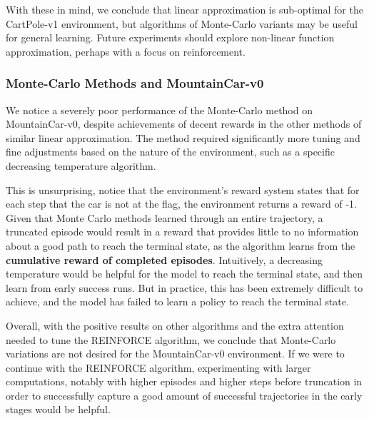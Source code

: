 \documentclass{article}
\begin{document}
With these in mind, we conclude that linear approximation is sub-optimal
for the CartPole-v1 environment, but algorithms of Monte-Carlo variants may be useful for general learning.
Future experiments should explore non-linear function approximation, perhaps with a focus on reinforcement.

\subsubsection{Monte-Carlo Methods and MountainCar-v0}
We notice a severely poor performance of the Monte-Carlo method on MountainCar-v0,
despite achievements of decent rewards in the other methods of similar linear approximation. The method required
significantly more tuning and fine adjustments based on the nature of the environment,
such as a specific decreasing temperature algorithm.

This is unsurprising, notice that the environment's reward system states that
for each step that the car is not at the flag, the environment returns a reward of -1.
Given that Monte Carlo methods learned through an entire trajectory, a truncated
episode would result in a reward that provides little to no information about a good path to
reach the terminal state, as the algorithm learns from the \textbf{cumulative reward of completed episodes}.
Intuitively, a decreasing temperature would be helpful for the model to reach the terminal state, and then learn from early success runs.
But in practice, this has been extremely difficult to achieve, and the model has failed to learn
a policy to reach the terminal state.

Overall, with the positive results on other algorithms and the extra attention needed to tune the
REINFORCE algorithm, we conclude that Monte-Carlo variations are not desired for the MountainCar-v0 environment.
If we were to continue with the REINFORCE algorithm, experimenting with larger
computations, notably with higher episodes and higher steps before truncation in order to successfully capture
a good amount of successful trajectories in the early stages would be helpful.

\newpage


\end{document}
